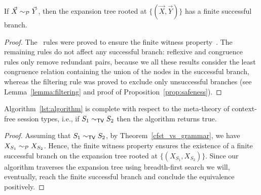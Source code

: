 \begin{proposition} 
\label{finite_witness}
	If $\vec X \sim_{\mathcal{P}} \vec Y$, then the expansion tree rooted at 
	$\{(\vec X, \vec Y)\}$ has a finite successful branch.
\end{proposition}

\begin{proof}
	The \BPA\ rules were proved to ensure the finite witness 
	property~\cite{janvcar1999techniques}. The remaining rules do not
	affect any successful branch: reflexive and congruence rules only remove 
	redundant pairs, because we all these results consider the least 
	congruence relation containing the union of the nodes in the 
	successful branch, whereas the filtering rule was proved to exclude 
	only unsuccessful branches (see Lemma~\ref{lemma:filtering} and proof 
	of Proposition~\ref{prop:safeness}).
\end{proof}

\begin{theorem}
	Algorithm~\ref{lst:algorithm} is complete with respect to the meta-theory 
	of context-free session types, i.e., if $S_1 \sim_{\mathsf{TV}} S_2$ then 
	the algorithm returns \textsf{true}.
\end{theorem}

\begin{proof}
	Assuming that $S_1 \sim_{\mathsf{TV}} S_2$, by Theorem~\ref{cfst_vs_grammar}, we 
	have $X_{S_1} \sim_{\mathcal{P}} X_{S_2}$. Hence, the finite witness property 
	ensures the existence of a finite successful branch on the expansion 
	tree rooted at $\{(X_{S_1},  X_{S_2})\}$. Since our algorithm traverses 
	the expansion tree using breadth-first search we will, eventually, 
	reach the finite successful branch and conclude the equivalence positively.
\end{proof}
